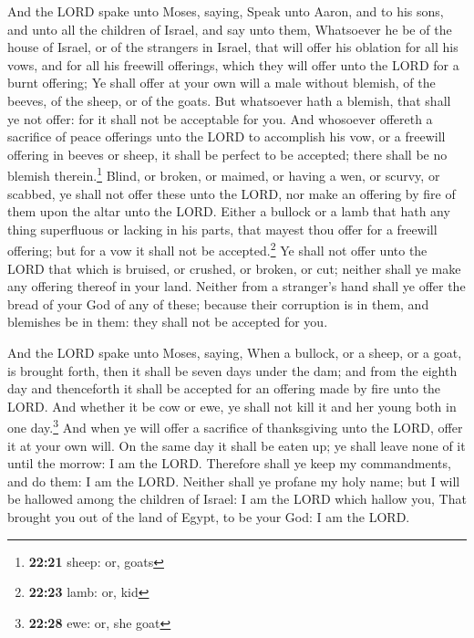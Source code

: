  And the LORD spake unto Moses, saying, 
Speak unto Aaron, and to his sons, and unto all the children of Israel,
and say unto them, Whatsoever he be of the house of Israel, or of the
strangers in Israel, that will offer his oblation for all his vows, and
for all his freewill offerings, which they will offer unto the LORD for
a burnt offering;  Ye shall offer at your own will a male
without blemish, of the beeves, of the sheep, or of the goats.
 But whatsoever hath a blemish, that shall ye not offer:
for it shall not be acceptable for you.  And whosoever
offereth a sacrifice of peace offerings unto the LORD to accomplish his
vow, or a freewill offering in beeves or sheep, it shall be perfect to
be accepted; there shall be no blemish therein.\footnote{\textbf{22:21}
  sheep: or, goats}  Blind, or broken, or maimed, or
having a wen, or scurvy, or scabbed, ye shall not offer these unto the
LORD, nor make an offering by fire of them upon the altar unto the LORD.
 Either a bullock or a lamb that hath any thing
superfluous or lacking in his parts, that mayest thou offer for a
freewill offering; but for a vow it shall not be accepted.\footnote{\textbf{22:23}
  lamb: or, kid}  Ye shall not offer unto the LORD that
which is bruised, or crushed, or broken, or cut; neither shall ye make
any offering thereof in your land.  Neither from a
stranger's hand shall ye offer the bread of your God of any of these;
because their corruption is in them, and blemishes be in them: they
shall not be accepted for you.

 And the LORD spake unto Moses, saying, 
When a bullock, or a sheep, or a goat, is brought forth, then it shall
be seven days under the dam; and from the eighth day and thenceforth it
shall be accepted for an offering made by fire unto the LORD.
 And whether it be cow or ewe, ye shall not kill it and
her young both in one day.\footnote{\textbf{22:28} ewe: or, she goat}
 And when ye will offer a sacrifice of thanksgiving unto
the LORD, offer it at your own will.  On the same day it
shall be eaten up; ye shall leave none of it until the morrow: I am the
LORD.  Therefore shall ye keep my commandments, and do
them: I am the LORD.  Neither shall ye profane my holy
name; but I will be hallowed among the children of Israel: I am the LORD
which hallow you,  That brought you out of the land of
Egypt, to be your God: I am the LORD.

